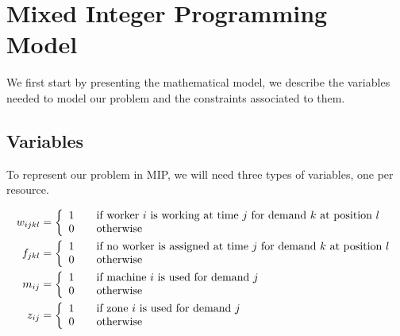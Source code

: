 \documentclass[../../thesis.tex]{subfiles}
\begin{document}
\section{Mixed Integer Programming Model}
\label{section:mipmodel}

We first start by presenting the mathematical model, we describe the variables
needed to model our problem and the constraints associated to them.

\subsection{Variables}

To represent our problem in MIP, we will need three types of variables, one per resource.



\begin{equation*}
\begin{split}
    w_{ijkl} &=  \left \{
                   \begin{array}{l l}
                      1 \quad & \textrm{if worker $i$ is working at time $j$ for demand $k$ at position $l$} \\
                      0 \quad & \textrm{otherwise} 
                   \end{array}
                   \right . \\
  f_{jkl} &=  \left \{
  \begin{array}{l l}
      1 \quad & \textrm{if no worker is assigned at time $j$ for demand $k$ at position $l$} \\
      0 \quad & \textrm{otherwise} 
  \end{array}
  \right . \\
   m_{ij} &=  \left \{
                   \begin{array}{l l}
                      1 \quad & \textrm{if machine $i$ is used for demand $j$} \\
                      0 \quad & \textrm{otherwise} 
                   \end{array}
                   \right . \\
    z_{ij} &= \left \{
               \begin{array}{l l}
                  1 \quad & \textrm{if zone $i$ is used for demand $j$} \\
                  0 \quad & \textrm{otherwise} 
               \end{array}
               \right . \\
\end{split}
\end{equation*}
\end{document}
